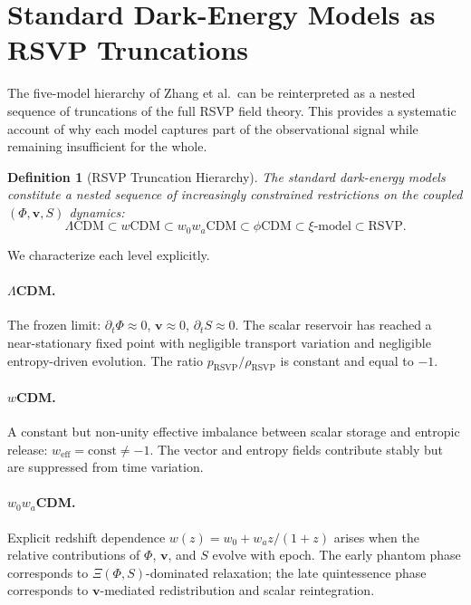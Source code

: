\documentclass[12pt,a4paper]{article}
\newtheorem{definition}[theorem]{Definition}
\theoremstyle{remark}
\newcommand{\vv}{\mathbf{v}}
\newcommand{\rhoRSVP}{\rho_{\mathrm{RSVP}}}
\newcommand{\pRSVP}{p_{\mathrm{RSVP}}}
\newcommand{\weff}{w_{\mathrm{eff}}}
\begin{document}
\section{Standard Dark-Energy Models as RSVP Truncations}
\label{sec:truncation}

The five-model hierarchy of Zhang et al.\ can be reinterpreted as a nested sequence of truncations of the full RSVP field theory. This provides a systematic account of why each model captures part of the observational signal while remaining insufficient for the whole.

\begin{definition}[RSVP Truncation Hierarchy]
The standard dark-energy models constitute a nested sequence of increasingly constrained restrictions on the coupled $(\Phi, \vv, S)$ dynamics:
\begin{equation}
\Lambda\mathrm{CDM} \subset w\mathrm{CDM} \subset w_0w_a\mathrm{CDM} \subset \phi\mathrm{CDM} \subset \xi\text{-model} \subset \mathrm{RSVP}.
\label{eq:hierarchy}
\end{equation}
\end{definition}

We characterize each level explicitly.

\paragraph{$\Lambda$CDM.} The frozen limit: $\partial_t \Phi \approx 0$, $\vv \approx 0$, $\partial_t S \approx 0$. The scalar reservoir has reached a near-stationary fixed point with negligible transport variation and negligible entropy-driven evolution. The ratio $\pRSVP / \rhoRSVP$ is constant and equal to $-1$.

\paragraph{$w$CDM.} A constant but non-unity effective imbalance between scalar storage and entropic release: $\weff = \mathrm{const} \ne -1$. The vector and entropy fields contribute stably but are suppressed from time variation.

\paragraph{$w_0 w_a$CDM.} Explicit redshift dependence $w(z) = w_0 + w_a z/(1+z)$ arises when the relative contributions of $\Phi$, $\vv$, and $S$ evolve with epoch. The early phantom phase corresponds to $\Xi(\Phi, S)$-dominated relaxation; the late quintessence phase corresponds to $\vv$-mediated redistribution and scalar reintegration.
\end{document}
